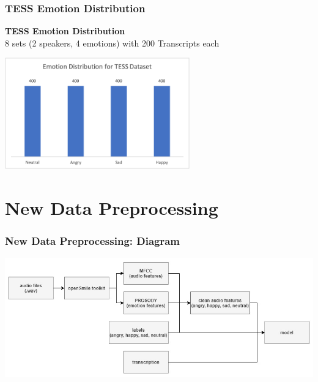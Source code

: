 \documentclass{beamer}
\begin{document}
\begin{frame}
\frametitle{TESS Emotion Distribution}

\textbf{TESS Emotion Distribution}
\\
8 sets (2 speakers, 4 emotions) with 200 Transcripts each

\begin{center}
    \includegraphics[width=8cm]{images/emo_tess.png}
\end{center}
\end{frame}








\section{New Data Preprocessing}


\begin{frame}
\frametitle{New Data Preprocessing: Diagram}

\begin{center}
    \includegraphics[width=\linewidth,height=\textheight,keepaspectratio]{images/flowchart.jpg}
\end{center}
\end{frame}
\end{document}
